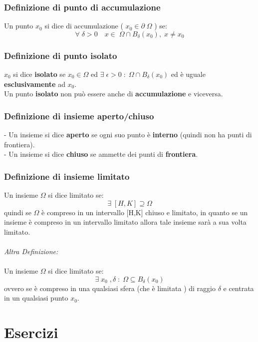 \documentclass[fontsize = 20px, paper = a4]{article}
\begin{document}
\subsubsection{Definizione di punto di accumulazione}
Un punto $x_0$ si dice di accumulazione ( $x_0 \in \partial \; \Omega$ ) se:
$$\forall \; \delta > 0 \quad x \in \; \Omega \cap B_\delta \left(x_0 \right), \; x \neq x_0$$
\subsubsection{Definizione di punto isolato}
$x_0$ si dice \textbf{isolato} se $x_0 \in \Omega$ ed $\exists \; \epsilon > 0 \; : \; \Omega \cap B_\delta(x_0)$ ed è uguale \textbf{esclusivamente} ad $x_0$. \\
Un punto \textbf{isolato} non può essere anche di \textbf{accumulazione} e viceversa.
\subsubsection{Definizione di insieme aperto/chiuso}
- Un insieme si dice \textbf{aperto} se ogni suo punto è \textbf{interno} (quindi non ha punti di frontiera). \\
- Un insieme si dice \textbf{chiuso} se ammette dei punti di \textbf{frontiera}.
\subsubsection{Definizione di insieme limitato}
Un insieme $\Omega$ si dice limitato se:
$$\exists \; [H,K] \supseteq \Omega$$
quindi se $\Omega$ è compreso in un intervallo [H,K] chiuso e limitato, in quanto se un insieme è compreso in un intervallo limitato allora tale insieme sarà a sua volta limitato.\\\\
\emph{Altra Definizione:}\\ \\
Un insieme $\Omega$ si dice limitato se:
$$\exists \; x_0 \; , \delta \; : \; \Omega \subseteq B_\delta(x_0)$$
ovvero se è compreso in una qualsiasi sfera (che è limitata ) di raggio $\delta$ e centrata in un qualsiasi punto $x_0$.

\section{Esercizi}
\end{document}
